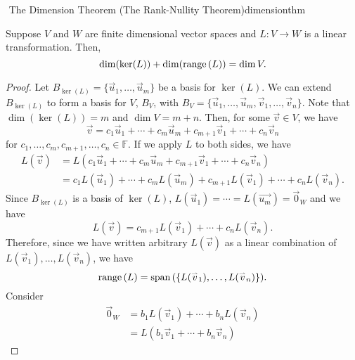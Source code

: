         \begin{theorem}{\Stop\,\,The Dimension Theorem (The Rank-Nullity Theorem)}{dimensionthm}

            Suppose \(V\) and \(W\) are finite dimensional vector spaces and \(L:V\to W\) is a linear transformation. Then,
            \begin{equation*}
                \dim(\ker(L))+\dim(\text{range\,}(L))=\dim V.
            \end{equation*}
            \begin{proof}
                Let \(B_{\ker(L)}=\{\vec{u}_1,\ldots,\vec{u}_m\}\) be a basis for \(\ker(L)\). We can extend \(B_{\ker(L)}\) to form a basis for \(V\), \(B_V\), with \(B_V=\{\vec{u}_1,\ldots,\vec{u}_m,\vec{v}_1,\ldots,\vec{v}_n\}\). Note that \(\dim(\ker(L))=m\) and \(\dim V=m+n\). Then, for some \(\vec{v}\in V\), we have
                \begin{equation*}
                    \vec{v}=c_1\vec{u}_1+\cdots+c_m\vec{u}_m+c_{m+1}\vec{v}_1+\cdots+c_n\vec{v}_n
                \end{equation*}
                for \(c_1,\ldots,c_m,c_{m+1},\ldots,c_n\in\mathbb{F}\). If we apply \(L\) to both sides, we have
                \begin{align*}
                    L(\vec{v})&=L(c_1\vec{u}_1+\cdots+c_m\vec{u}_m+c_{m+1}\vec{v}_1+\cdots+c_n\vec{v}_n) \\
                    &=c_1L(\vec{u}_1)+\cdots+c_mL(\vec{u}_m)+c_{m+1}L(\vec{v}_1)+\cdots+c_nL(\vec{v}_n).
                \end{align*}
                Since \(B_{\ker(L)}\) is a basis of \(\ker(L)\), \(L(\vec{u}_1)=\cdots=L(\vec{u_m})=\vec{0}_W\) and we have
                \begin{equation*}
                    L(\vec{v})=c_{m+1}L(\vec{v}_1)+\cdots+c_nL(\vec{v}_n).
                \end{equation*}
                Therefore, since we have written arbitrary \(L(\vec{v})\) as a linear combination of \(L(\vec{v}_1),\ldots,L(\vec{v}_n)\), we have 
                \begin{equation*}
                    \text{range\,}(L)=\text{span\,}(\{L(\overset{_{\rightharpoonup}}{v}_1),\ldots,L(\overset{_{\rightharpoonup}}{v}_n)\}).
                \end{equation*}
                Consider
                \begin{align*}
                    \vec{0}_W&=b_1L(\vec{v}_1)+\cdots+b_nL(\vec{v}_n) \\
                    &=L(b_1\vec{v}_1+\cdots+b_n\vec{v}_n)

\end{align*}
\end{proof}
\end{theorem}
